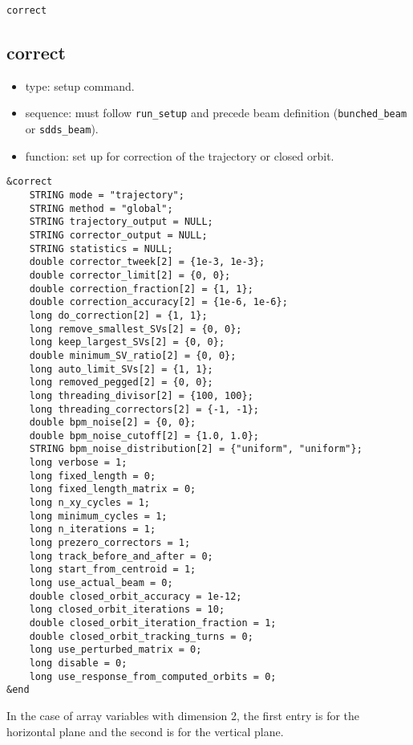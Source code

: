 \documentclass[11pt]{article}
\begin{document}
\newpage
\begin{center}{\Large\verb|correct|}\end{center}
\subsection{correct \label{subsec:correct}}

\begin{itemize}
\item type: setup command.
\item sequence: must follow \verb|run_setup| and precede beam definition (\verb|bunched_beam| or \verb|sdds_beam|).
\item function: set up for correction of the trajectory or closed orbit.
\end{itemize}

\begin{verbatim}
&correct
    STRING mode = "trajectory";
    STRING method = "global";
    STRING trajectory_output = NULL;
    STRING corrector_output = NULL;
    STRING statistics = NULL;
    double corrector_tweek[2] = {1e-3, 1e-3};
    double corrector_limit[2] = {0, 0};
    double correction_fraction[2] = {1, 1};
    double correction_accuracy[2] = {1e-6, 1e-6};
    long do_correction[2] = {1, 1};
    long remove_smallest_SVs[2] = {0, 0};
    long keep_largest_SVs[2] = {0, 0};
    double minimum_SV_ratio[2] = {0, 0};
    long auto_limit_SVs[2] = {1, 1};
    long removed_pegged[2] = {0, 0};
    long threading_divisor[2] = {100, 100};
    long threading_correctors[2] = {-1, -1};
    double bpm_noise[2] = {0, 0};
    double bpm_noise_cutoff[2] = {1.0, 1.0};
    STRING bpm_noise_distribution[2] = {"uniform", "uniform"};
    long verbose = 1;
    long fixed_length = 0;
    long fixed_length_matrix = 0;
    long n_xy_cycles = 1;
    long minimum_cycles = 1;
    long n_iterations = 1;
    long prezero_correctors = 1;
    long track_before_and_after = 0;
    long start_from_centroid = 1;
    long use_actual_beam = 0;
    double closed_orbit_accuracy = 1e-12;
    long closed_orbit_iterations = 10;
    double closed_orbit_iteration_fraction = 1;
    double closed_orbit_tracking_turns = 0;
    long use_perturbed_matrix = 0;
    long disable = 0;
    long use_response_from_computed_orbits = 0;
&end
\end{verbatim}

In the case of array variables with dimension 2, the first entry is for the horizontal plane and the second
is for the vertical plane.
\end{document}
